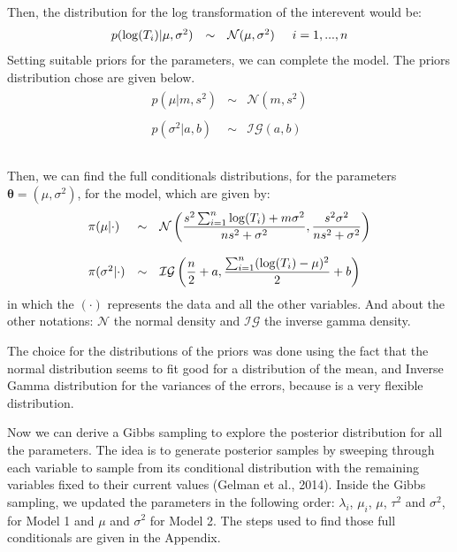 \documentclass{asaproc}
\begin{document}
Then, the distribution for the log transformation of the interevent would be:
\begin{eqnarray*}
\begin{array}{rcl}
p(\log(T_i)|\mu,\sigma^2) & \sim & \mathcal{N}(\mu,\sigma^2)  \hspace{0.5cm} i = 1,...,n
\end{array}
\end{eqnarray*}
Setting suitable priors for the parameters, we can complete the model. The priors distribution chose are given below.
\begin{eqnarray*}
\begin{array}{rcl}
p(\mu|m,s^2) & \sim & \mathcal{N}\left(m,s^2\right) \\ \\

p(\sigma^2|a,b) & \sim & \mathcal{IG}\left(a,b\right) \\\\
\end{array}
\end{eqnarray*}

Then, we can find the full conditionals distributions, for the parameters $\boldsymbol{\theta} = (\mu, \sigma^2)$, for the model, which are given by:
\begin{eqnarray*}
\begin{array}{lcl ll }
\pi(\mu|\cdot) & \sim &\mathcal{N}\left( \dfrac{s^2\sum_{i=1}^{n} \log(T_i) + m\sigma^2}{n s^2 + \sigma^2}, \dfrac{s^2\sigma^2}{n s^2 + \sigma^2} \right) \\ \\

\pi(\sigma^2|\cdot) & \sim & \mathcal{IG}\left( \dfrac{n}{2}+a,  \dfrac{\sum_{i=1}^{n} (\log(T_i) - \mu)^2}{2} + b \right) 
\end{array}
\end{eqnarray*}
in which the $(\cdot)$ represents the data and all the other variables. And about the other notations: $\mathcal{N}$ the normal density and $\mathcal{IG}$ the inverse gamma density.

The choice for the distributions of the priors was done using the fact that the normal distribution seems to fit good for a distribution of the mean, and Inverse Gamma distribution for the variances of the errors, because is a very flexible distribution.

Now we can derive a Gibbs sampling to explore the posterior distribution for all the parameters. The idea is to generate posterior samples by sweeping through each variable to sample from its conditional distribution with the remaining variables fixed to their current values (Gelman et al., 2014). Inside the Gibbs sampling, we updated the parameters in the following order: $\lambda_i$, $\mu_i$, $\mu$, $\tau^2$ and $\sigma^2$, for Model 1 and $\mu$ and $\sigma^2$ for Model 2. The steps used to find those full conditionals are given in the Appendix.
\end{document}
